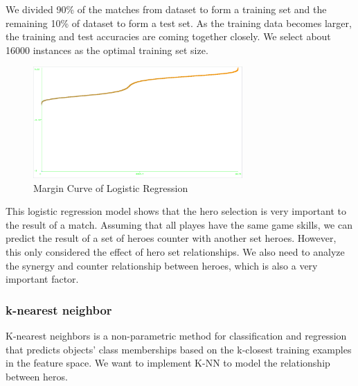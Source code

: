\begin{enumerate}
We divided 90\% of the matches from dataset to form a training set and the remaining 10\% of dataset to form a test set. As the training data becomes larger, the training and test accuracies are coming together closely. We select about 16000 instances as the optimal training set size. 


\begin{figure}[!htbp]
\centering
\includegraphics[width=8.0cm]{margincurve.PNG} 
\newline
\caption{Margin Curve of Logistic Regression}
\label{fig:margincurve} 
\end{figure}

This logistic regression model shows that the hero selection is very important to the result of a match. Assuming that all playes have the same game skills, we can predict the result of a set of heroes counter with another set heroes.
However, this only considered the effect of hero set relationships. We also need to analyze the synergy and counter relationship between heroes, which is also a very important factor.

\subsubsection{k-nearest neighbor}
K-nearest neighbors is a non-parametric method for classification and regression that predicts objects’ class memberships based on the k-closest training examples in the feature space. We want to implement K-NN to model the relationship between heros.


\end{enumerate}


